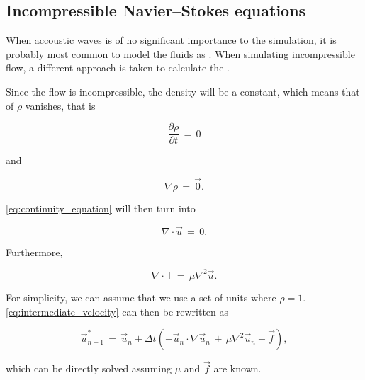 \subsection{Incompressible Navier--Stokes equations}

When accoustic waves is of no significant importance to the simulation, it is probably most common to model the fluids as \incompressible. When simulating incompressible flow, a different approach is taken to calculate the .

Since the flow is incompressible, the density will be a constant, which means that \derivatives of $\rho$ vanishes, that is

\begin{equation} \label{eq:density_partial_time_derivative_incompressible_flow}
\frac{\partial \rho}{\partial t} \,=\, 0
\end{equation}

and

\begin{equation} \label{eq:density_divergence_incompressible_flow}
\nabla\rho \,=\, \vec{0}.
\end{equation}

\eqref{eq:continuity_equation} will then turn into

\begin{equation} \label{eq:velocity_divergence_incompressible_flow}
\nabla\cdot\vec{u} \,=\, 0.
\end{equation}

Furthermore, %

\begin{equation} \label{eq:deviatoric_stress_tensor_incompressible_flow}
\nabla\cdot\boldsymbol{\mathsf{T}} \,=\, \mu\nabla^2\vec{u}.
\end{equation}

For simplicity, we can assume that we use a set of units where $\rho = 1$. \eqref{eq:intermediate_velocity} can then be rewritten as

\begin{equation} \label{eq:intermediate_velocity_reduced}
\vec{u}^*_{n+1} \,= \, \vec{u}_{n} + \Delta t(- \vec{u}_{n}\cdot\nabla\vec{u}_{n} \,+\, \mu\nabla^2\vec{u}_{n} + \vec{f}),
\end{equation}

which can be directly solved assuming $\mu$ and $\vec{f}$ are known.


